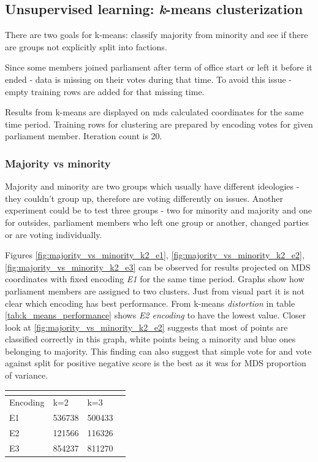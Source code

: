 \documentclass[a4paper,12pt]{article}
\begin{document}
	\clearpage
	
	\subsection{Unsupervised learning: {\textit k-means} clusterization }
	
	
	There are two goals for \gls{k-means}: classify majority from minority and see if there are groups not explicitly split into factions.
	
	Since some members joined parliament after term of office start or left it before it ended - data is missing on their votes during that time. To avoid this issue - empty training rows are added for that missing time.
	
	Results from \gls{k-means} are displayed on \acrshort{mds} calculated coordinates for the same time period. Training rows for clustering are prepared by encoding votes for given parliament member. Iteration count is 20.
	
	\subsubsection{Majority vs minority} 
	
	Majority and minority are two groups which usually have different ideologies - they couldn't group up, therefore are voting differently on issues. Another experiment could be to test three groups - two for minority and majority and one for outsides, parliament members who left one group or another, changed parties or are voting individually.
	
	Figures \ref{fig:majority_vs_minority_k2_e1}, \ref{fig:majority_vs_minority_k2_e2}, \ref{fig:majority_vs_minority_k2_e3} can be observed for results projected on MDS coordinates with fixed encoding \textit{E1} for the same time period. Graphs show how parliament members are assigned to two clusters. Just from visual part it is not clear which encoding has best performance. From \Gls{k-means} \textit{distortion} in table \ref{tab:k_means_performance} shows \textit{E2 encoding} to have the lowest value. Closer look at \ref{fig:majority_vs_minority_k2_e2} suggests that most of points are classified correctly in this graph, white points being a minority and blue ones belonging to majority. This finding can also suggest that simple vote for and vote against split for positive negative score is the best as it was for MDS proportion of variance.
	
	
	\noindent
	\begin{center}
		\begin{tabular}{L{3cm} C{2cm} C{2cm} C{2cm}}
			\\ 
			\hline
			Encoding & k=2 & k=3 \\\hline
			E1 & 536738 & 500433 \\
			E2 & 121566 & 116326 \\
			E3 & 854237 & 811270 \\
			\hline
		\end{tabular}
		 \label{tab:k_means_performance}
	\end{center} 
	
\end{document}
